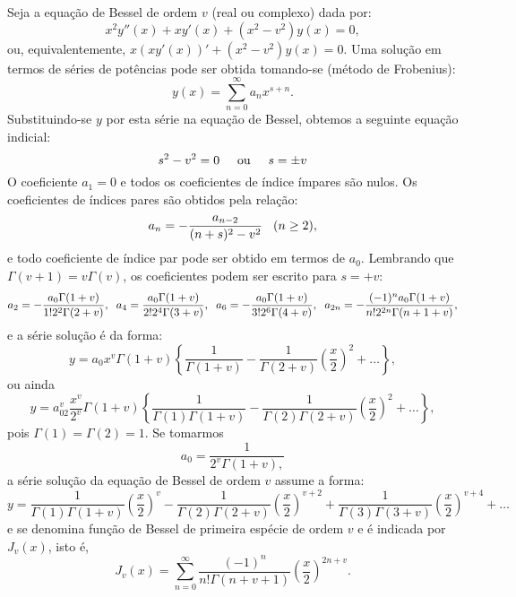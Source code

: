 \documentclass[10pt,a4paper]{article}
\newcommand{\prt}[1]{\left(#1\right)}
\newcommand{\chv}[1]{\left\{#1\right\}}
\begin{document}
	Seja a equação de Bessel de ordem $v$ (real ou complexo) dada por:
	\begin{equation}
		x^2y''(x) + xy'(x) + (x^2-v^2)y(x)=0,
		\label{eq:1}
	\end{equation}
	ou, equivalentemente, $x(xy'(x))' + (x^2-v^2)y(x)=0$. Uma solução em termos de séries de potências pode ser obtida tomando-se (método de Frobenius):
	\begin{equation}
		y(x)=\sum_{n=0}^\infty a_nx^{s+n}.
		\label{eq:2}
	\end{equation}
	Substituindo-se $y$ por esta série na equação de Bessel, obtemos a seguinte equação indicial:
	\begin{equation}
		s^2-v^2=0 \hspace{0.5cm} \text{ou} \hspace{0.5cm} s = \pm v
	\end{equation}
	O coeficiente $a_1=0$ e todos os coeficientes de índice ímpares são nulos. Os coeficientes de índices pares são obtidos pela relação:
	\begin{equation}
		a_n = -\frac{a_{n-2}}{(n+s)^2-v^2}\hspace{0.3cm} (n\geq 2),
	\end{equation}
	e todo coeficiente de índice par pode ser obtido em termos de $a_0$. Lembrando que $\Gamma(v+1) = v\Gamma(v)$, os coeficientes podem ser escrito para $s=+v$:
	\[a_2=-\frac{a_0\Gamma(1+v)}{1!2^2\Gamma(2+v)}, \hspace{0.2cm} a_4=\frac{a_0\Gamma(1+v)}{2!2^4\Gamma(3+v)}, \hspace{0.2cm} a_6=-\frac{a_0\Gamma(1+v)}{3!2^6\Gamma(4+v)}, \hspace{.2cm} a_{2n}=-\frac{(-1)^na_0\Gamma(1+v)}{n!2^{2n}\Gamma(n+1+v)},\]
	e a série solução é da forma:
	\[y = a_0x^v\Gamma(1+v)\left\{\frac{1}{\Gamma(1+v)}-\frac{1}{\Gamma(2+v)}\left(\frac{x}{2}\right)^2+\dots\right\},\]
	ou ainda
	\[y = a_02^v\frac{x^v}{2^v}\Gamma(1+v)\chv{\frac{1}{\Gamma(1)\Gamma(1+v)}-\frac{1}{\Gamma(2)\Gamma(2+v)}\prt{\frac{x}{2}}^2+\dots},\]
	pois $\Gamma(1)=\Gamma(2)=1$. Se tomarmos
	\[a_0=\frac{1}{2^v\Gamma(1+v),}\]
	a série solução da equação de Bessel de ordem $v$ assume a forma:
	\[y = \frac{1}{\Gamma(1)\Gamma(1+v)}\prt{\frac{x}{2}}^v - \frac{1}{\Gamma(2)\Gamma(2+v)}\prt{\frac{x}{2}}^{v+2} + \frac{1}{\Gamma(3)\Gamma(3+v)}\prt{\frac{x}{2}}^{v+4}+\dots\]
	e se denomina função de Bessel de primeira espécie de ordem $v$ e é indicada por $J_v(x)$, isto é,
	\begin{equation}
		J_v(x)=\sum_{n=0}^\infty \frac{(-1)^n}{n!\Gamma(n+v+1)}\prt{\frac{x}{2}}^{2n+v}.
	\end{equation}
	
\end{document}
